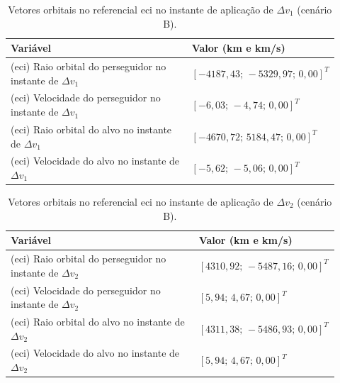 \begin{table}[H]
\centering
\caption{Vetores orbitais no referencial \gls{eci} no instante de aplicação de $\Delta v_1$ (cenário B).}
\label{tab_cap4_eciB_dv1}
\begingroup
\small
\setlength{\tabcolsep}{4pt}
\renewcommand{\arraystretch}{1.15}
\begin{tabular}{|p{0.58\linewidth}|p{0.34\linewidth}|}
\hline
Variável & Valor (km e km/s)\\
\hline
(\gls{eci}) Raio orbital do perseguidor no instante de $\Delta v_1$ &
$\left[-4187,43;\,-5329,97;\,0,00\right]^T$\\
\hline
(\gls{eci}) Velocidade do perseguidor no instante de $\Delta v_1$ &
$\left[-6,03;\,-4,74;\,0,00\right]^T$\\
\hline
(\gls{eci}) Raio orbital do alvo no instante de $\Delta v_1$ &
$\left[-4670,72;\,5184,47;\,0,00\right]^T$\\
\hline
(\gls{eci}) Velocidade do alvo no instante de $\Delta v_1$ &
$\left[-5,62;\,-5,06;\,0,00\right]^T$\\
\hline
\end{tabular}
\endgroup
\end{table}

\begin{table}[H]
\centering
\caption{Vetores orbitais no referencial \gls{eci} no instante de aplicação de $\Delta v_2$ (cenário B).}
\label{tab_cap4_eciB_dv2}
\begingroup
\small
\setlength{\tabcolsep}{4pt}
\renewcommand{\arraystretch}{1.15}
\begin{tabular}{|p{0.58\linewidth}|p{0.34\linewidth}|}
\hline
Variável & Valor (km e km/s)\\
\hline
(\gls{eci}) Raio orbital do perseguidor no instante de $\Delta v_2$ &
$\left[4310,92;\,-5487,16;\,0,00\right]^T$\\
\hline
(\gls{eci}) Velocidade do perseguidor no instante de $\Delta v_2$ &
$\left[5,94;\,4,67;\,0,00\right]^T$\\
\hline
(\gls{eci}) Raio orbital do alvo no instante de $\Delta v_2$ &
$\left[4311,38;\,-5486,93;\,0,00\right]^T$\\
\hline
(\gls{eci}) Velocidade do alvo no instante de $\Delta v_2$ &
$\left[5,94;\,4,67;\,0,00\right]^T$\\
\hline
\end{tabular}
\endgroup
\end{table}

